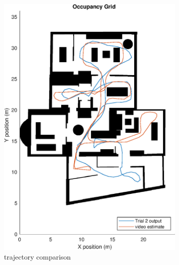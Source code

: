 \begin{figure}[H]
	\centering
	\begin{subfigure}[t]{.45\textwidth}
		\centering
		\includegraphics[width=0.9\linewidth]{images/20201118_1902_trial2_output_2}
		\caption{trajectory comparison}
		\label{fig:shspf_trial2_on_map}
	\end{subfigure}
	\begin{subfigure}[t]{.45\textwidth}
		\centering

\end{subfigure}
\end{figure}
